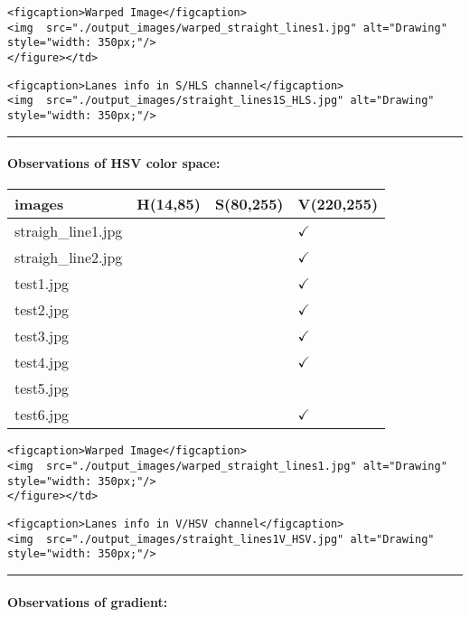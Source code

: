 \documentclass[11pt]{article}
\begin{document}
\begin{verbatim}
<figcaption>Warped Image</figcaption>
<img  src="./output_images/warped_straight_lines1.jpg" alt="Drawing" style="width: 350px;"/>
</figure></td>
\end{verbatim}

\begin{verbatim}
<figcaption>Lanes info in S/HLS channel</figcaption>
<img  src="./output_images/straight_lines1S_HLS.jpg" alt="Drawing" style="width: 350px;"/>
\end{verbatim}

\begin{center}\rule{0.5\linewidth}{\linethickness}\end{center}

\paragraph{Observations of HSV color
space:}\label{observations-of-hsv-color-space}

\begin{longtable}[]{@{}llll@{}}
\toprule
images & H(14,85) & S(80,255) & V(220,255)\tabularnewline
\midrule
\endhead
straigh\_line1.jpg & & & \textbf{\(\checkmark\)}\tabularnewline
straigh\_line2.jpg & & & \textbf{\(\checkmark\)}\tabularnewline
test1.jpg & & & \textbf{\(\checkmark\)}\tabularnewline
test2.jpg & & & \textbf{\(\checkmark\)}\tabularnewline
test3.jpg & & & \textbf{\(\checkmark\)}\tabularnewline
test4.jpg & & & \textbf{\(\checkmark\)}\tabularnewline
test5.jpg & & &\tabularnewline
test6.jpg & & & \textbf{\(\checkmark\)}\tabularnewline
\bottomrule
\end{longtable}

\begin{verbatim}
<figcaption>Warped Image</figcaption>
<img  src="./output_images/warped_straight_lines1.jpg" alt="Drawing" style="width: 350px;"/>
</figure></td>
\end{verbatim}

\begin{verbatim}
<figcaption>Lanes info in V/HSV channel</figcaption>
<img  src="./output_images/straight_lines1V_HSV.jpg" alt="Drawing" style="width: 350px;"/>
\end{verbatim}

\begin{center}\rule{0.5\linewidth}{\linethickness}\end{center}

\paragraph{Observations of gradient:}\label{observations-of-gradient}
\end{document}
